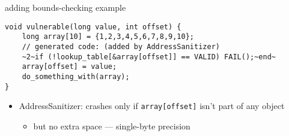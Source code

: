 \begin{frame}[fragile,label=asanVBounds]{adding bounds-checking example}
\begin{lstlisting}
void vulnerable(long value, int offset) {
    long array[10] = {1,2,3,4,5,6,7,8,9,10};
    // generated code: (added by AddressSanitizer)
    ~2~if (!lookup_table[&array[offset]] == VALID) FAIL();~end~
    array[offset] = value;
    do_something_with(array);
}
\end{lstlisting}
    \begin{itemize}
        \item AddressSanitizer: crashes only if \lstinline|array[offset]| isn't part of any object
            \begin{itemize}
            \item but no extra space --- single-byte precision
            \end{itemize}
    \end{itemize}
\end{frame}


